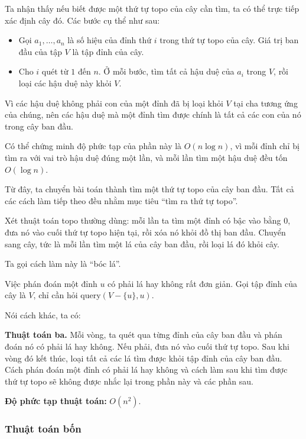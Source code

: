 \documentclass[11pt]{article}
\begin{document}
Ta nhận thấy nếu biết được một thứ tự topo của cây cần tìm, ta có thể trực tiếp
xác định cây đó. Các bước cụ thể như sau:

\begin{itemize}
  \item Gọi \(a_1,\ldots,a_n\) là số hiệu của đỉnh thứ \(i\) trong thứ tự topo
  của cây. Giá trị ban đầu của tập \(V\) là tập đỉnh của cây.
  \item Cho \(i\) quét từ \(1\) đến \(n\). Ở mỗi bước, tìm tất cả hậu duệ của
  \(a_i\) trong \(V\), rồi loại các hậu duệ này khỏi \(V\).
\end{itemize}

Vì các hậu duệ không phải con của một đỉnh đã bị loại khỏi \(V\) tại cha tương
ứng của chúng, nên các hậu duệ mà một đỉnh tìm được chính là tất cả các con của
nó trong cây ban đầu.

Có thể chứng minh độ phức tạp của phần này là \(O(n\log n)\), vì mỗi đỉnh chỉ
bị tìm ra với vai trò hậu duệ đúng một lần, và mỗi lần tìm một hậu duệ đều tốn
\(O(\log n)\).

Từ đây, ta chuyển bài toán thành tìm một thứ tự topo của cây ban đầu. Tất cả
các cách làm tiếp theo đều nhằm mục tiêu ``tìm ra thứ tự topo''.

Xét thuật toán topo thường dùng: mỗi lần ta tìm một đỉnh có bậc vào bằng \(0\),
đưa nó vào cuối thứ tự topo hiện tại, rồi xóa nó khỏi đồ thị ban đầu. Chuyển
sang cây, tức là mỗi lần tìm một lá của cây ban đầu, rồi loại lá đó khỏi cây.

Ta gọi cách làm này là ``bóc lá''.

Việc phán đoán một đỉnh \(u\) có phải lá hay không rất đơn giản. Gọi tập đỉnh
của cây là \(V\), chỉ cần hỏi \(\mathrm{query}(V-\{u\},u)\).

Nói cách khác, ta có:

\textbf{Thuật toán ba.} Mỗi vòng, ta quét qua từng đỉnh của cây ban đầu và phán
đoán nó có phải lá hay không. Nếu phải, đưa nó vào cuối thứ tự topo. Sau khi
vòng đó kết thúc, loại tất cả các lá tìm được khỏi tập đỉnh của cây ban đầu.
Cách phán đoán một đỉnh có phải lá hay không và cách làm sau khi tìm được thứ
tự topo sẽ không được nhắc lại trong phần này và các phần sau.

\textbf{Độ phức tạp thuật toán:} \(O(n^2)\).

\subsubsection{Thuật toán bốn}
\end{document}
